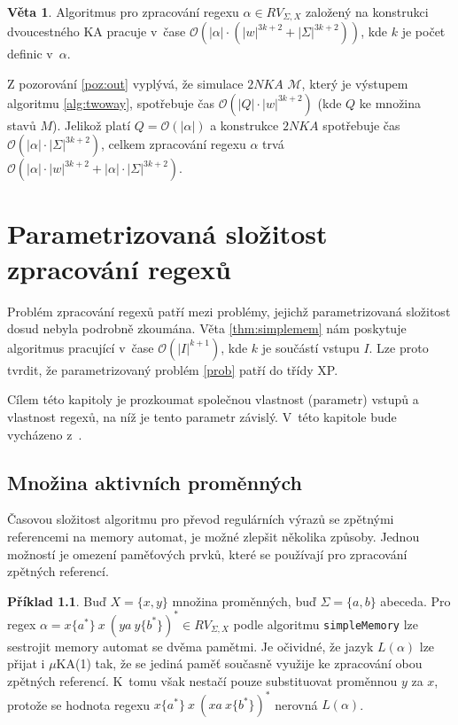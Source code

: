 \documentclass[thesis=B,czech]{FITthesis}[2019/12/23]
\theoremstyle{definition}
\newtheorem{example}{Příklad}[chapter]
\newtheorem{theorem}{Věta}[chapter]
\begin{document}
\begin{theorem}\label{thm:ctime}Algoritmus pro zpracování regexu $\alpha \in RV_{\Sigma, X}$ založený na konstrukci dvoucestného KA pracuje v~čase $\mathcal{O}(|\alpha|\cdot(|w|^{3k+2} + |\Sigma|^{3k+2}))$, kde $k$ je počet definic v~$\alpha$. \end{theorem}
Z pozorování \ref{poz:out} vyplývá, že simulace $2NKA$ $\mathcal{M}$, který je výstupem algoritmu \ref{alg:twoway}, spotřebuje čas $\mathcal{O}(|Q|\cdot|w|^{3k+2})$ (kde $Q$ ke množina stavů $M$). Jelikož platí $Q=\mathcal{O}(|\alpha|)$ a konstrukce $2NKA$ spotřebuje čas $\mathcal{O}(|\alpha|\cdot|\Sigma|^{3k+2})$, celkem zpracování regexu $\alpha$ trvá $\mathcal{O}(|\alpha|\cdot|w|^{3k+2} + |\alpha|\cdot|\Sigma|^{3k+2})$.
\fi
\chapter{Parametrizovaná složitost zpracování regexů}

Problém zpracování regexů patří mezi problémy, jejichž parametrizovaná složitost dosud nebyla podrobně zkoumána. Věta \ref{thm:simplemem} nám poskytuje algoritmus pracující v~čase $\mathcal{O}(|I|^{k+1})$, kde $k$ je součástí vstupu $I$. Lze proto tvrdit, že parametrizovaný problém \ref{prob} patří do třídy XP.

Cílem této kapitoly je prozkoumat společnou vlastnost (parametr) vstupů a vlastnost regexů, na níž je tento parametr závislý. V~této kapitole bude vycházeno z~\cite{schmidref}.

\section{Množina aktivních proměnných}

Časovou složitost algoritmu pro převod regulárních výrazů se zpětnými referencemi na memory automat, je možné zlepšit několika způsoby. Jednou možností je omezení paměťových prvků, které se používají pro zpracování zpětných referencí.  

\begin{example}\label{ex:avd}
Buď $X=\{x, y\}$ množina proměnných, buď $\Sigma=\{a, b\} $ abeceda. Pro regex $\alpha = x \{a^\ast\} \ x \ ( y a \ y \{b^\ast\})^\ast \in RV_{\Sigma, X}$ podle algoritmu \texttt{simpleMemory} lze sestrojit memory automat se dvěma pamětmi. Je očividné, že jazyk $L(\alpha)$ lze přijat i $\mu$KA(1) tak, že se jediná paměť současně využije ke zpracování obou zpětných referencí. K~tomu však nestačí pouze substituovat proměnnou $y$ za $x$, protože se hodnota regexu $ x \{a^\ast\} \ x \ ( xa \ x \{b^\ast\})^\ast$ nerovná $L(\alpha)$. 
\end{example}
\end{document}
